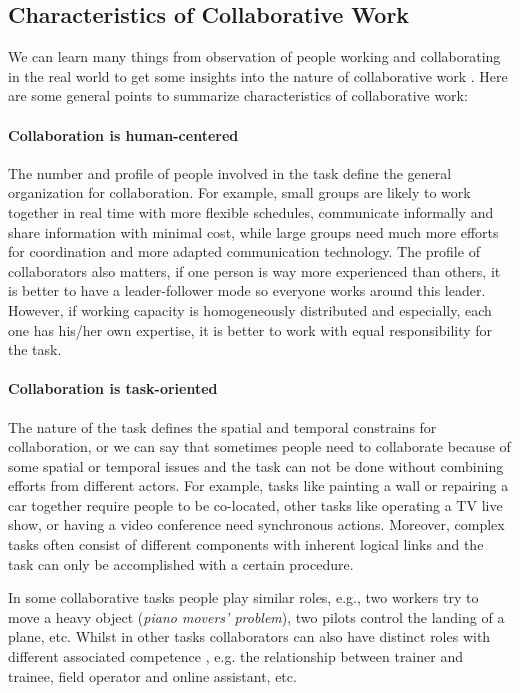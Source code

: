 \subsection{Characteristics of Collaborative Work}
We can learn many things from observation of people working and collaborating in the real world to get some insights into the nature of collaborative work \citep{Churchill1998CVE}. Here are some general points to summarize characteristics of collaborative work:

\paragraph{Collaboration is human-centered} The number and profile of people involved in the task define the general organization for collaboration. For example, small groups are likely to work together in real time with more flexible schedules, communicate informally and share information with minimal cost, while large groups need much more efforts for coordination and more adapted communication technology. The profile of collaborators also matters, if one person is way more experienced than others, it is better to have a leader-follower mode so everyone works around this leader. However, if working capacity is homogeneously distributed and especially, each one has his/her own expertise, it is better to work with equal responsibility for the task.

\paragraph{Collaboration is task-oriented} The nature of the task defines the spatial and temporal constrains for collaboration, or we can say that sometimes people need to collaborate because of some spatial or temporal issues and the task can not be done without combining efforts from different actors. For example, tasks like painting a wall or repairing a car together require people to be co-located, other tasks like operating a TV live show, or having a video conference need synchronous actions. Moreover, complex tasks often consist of different components with inherent logical links and the task can only be accomplished with a certain procedure.

In some collaborative tasks people play similar roles, e.g., two workers try to move a heavy object (\textit{piano movers' problem}), two pilots control the landing of a plane, etc. Whilst in other tasks collaborators can also have distinct roles with different associated competence \citep{Pouliquen2014Role}, e.g. the relationship between trainer and trainee, field operator and online assistant, etc.

